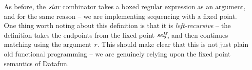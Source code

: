 \noindent
As before, the $\text{\itshape star}$ combinator takes a boxed regular expression as an
argument, and for the same reason -- we are implementing sequencing with a fixed
point. One thing worth noting about this definition is that it is
\emph{left-recursive} -- the definition takes the endpoints from the fixed point
$\text{\itshape self}$, and then continues matching using the argument $\text{\itshape r}$. This
should make clear that this is not just plain old functional programming -- we
are genuinely relying upon the fixed point semantics of Datafun.
